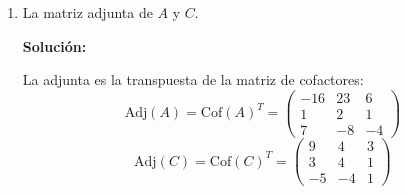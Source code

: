\documentclass[12pt]{article}
\newcommand{\solucion}{%
    \vspace{0.8em}%
    \textbf{Solución:}%
}
\begin{document}
\begin{enumerate}[label=\alph*.-]
    \textbf{Cofactores de $C$:}
    \[
    \begin{aligned}
    C_{11} &= (+1)\begin{vmatrix}3&0\\2&3\end{vmatrix} = 9 &\quad
    C_{12} &= (-1)\begin{vmatrix}-1&0\\1&3\end{vmatrix} = -(-3) = 3\\[4pt]
    C_{13} &= (+1)\begin{vmatrix}-1&3\\1&2\end{vmatrix} = -2-3 = -5 &\quad
    C_{21} &= (-1)\begin{vmatrix}-2&-1\\2&3\end{vmatrix} = -(-6+2) = 4\\[4pt]
    C_{22} &= (+1)\begin{vmatrix}1&-1\\1&3\end{vmatrix} = 3+1 = 4 &\quad
    C_{23} &= (-1)\begin{vmatrix}1&-2\\1&2\end{vmatrix} = -(2+2) = -4\\[4pt]
    C_{31} &= (+1)\begin{vmatrix}-2&-1\\3&0\end{vmatrix} = 0+3 = 3 &\quad
    C_{32} &= (-1)\begin{vmatrix}1&-1\\-1&0\end{vmatrix} = -(0-1) = 1\\[4pt]
    C_{33} &= (+1)\begin{vmatrix}1&-2\\-1&3\end{vmatrix} = 3-2 = 1 &
    \end{aligned}
    \]
    \[
    \text{Cof}(C) = \begin{pmatrix}9&3&-5\\4&4&-4\\3&1&1\end{pmatrix}
    \]

    \newpage
    \item La matriz adjunta de $A$ y $C$.

    \solucion

    La adjunta es la transpuesta de la matriz de cofactores:
    \[
    \text{Adj}(A) = \text{Cof}(A)^T =
    \begin{pmatrix}-16&23&6\\1&2&1\\7&-8&-4\end{pmatrix}
    \]
    \[
    \text{Adj}(C) = \text{Cof}(C)^T =
    \begin{pmatrix}9&4&3\\3&4&1\\-5&-4&1\end{pmatrix}
    \]


\end{enumerate}
\end{document}
